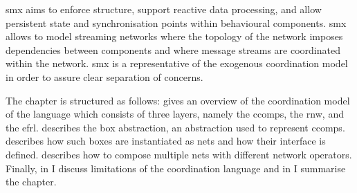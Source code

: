 \Gls*{smx} aims to enforce structure, support reactive data processing, and allow persistent state and synchronisation points within behavioural components.
\Gls*{smx} allows to model streaming networks where the topology of the network imposes dependencies between components and where message streams are coordinated within the network.
\Gls*{smx} is a representative of the exogenous coordination model~\cite{arbab2006} in order to assure clear separation of concerns.

The chapter is structured as follows:
\Sect{\ref{sect_smx_model}} gives an overview of the coordination model of the language which consists of three layers, namely the \glspl*{ccomp}, the \gls*{rnw}, and the \gls*{efrl}.
\Sect{\ref{sect_smx_box}} describes the box abstraction, an abstraction used to represent \glspl*{ccomp}.
\Sect{\ref{sect_smx_nets}} describes how such boxes are instantiated as nets and how their interface is defined.
\Sect{\ref{sect_smx_network}} describes how to compose multiple nets with different network operators.
Finally, in \Sect{\ref{sect_smx_conclusion}} I discuss limitations of the coordination language and in \Sect{\ref{sect_smx_summary}} I summarise the chapter.





